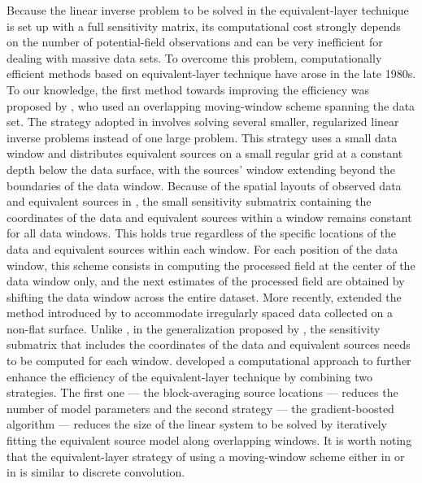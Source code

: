 Because the linear inverse problem to be solved in the equivalent-layer technique is set up 
with a full sensitivity matrix, its computational cost strongly depends on the number of 
potential-field observations and can be very inefficient for dealing with massive data sets. 
To overcome this problem, computationally efficient methods based on equivalent-layer 
technique have arose in the late 1980s. 
To our knowledge, the first method towards improving the efficiency  was proposed by \cite{leao-silva1989}, 
who used an overlapping moving-window scheme spanning the data set. 
The strategy adopted in \cite{leao-silva1989} involves solving several smaller, regularized linear 
inverse problems instead of one large problem. 
This strategy uses a small data window and distributes equivalent sources 
on a small regular grid at a constant depth below the data surface, with the sources' window extending beyond 
the boundaries of the data window.
Because of the spatial layouts of observed data and equivalent sources in \cite{leao-silva1989}, the small 
sensitivity submatrix containing the coordinates of the data and equivalent sources within a window remains 
constant for all data windows. This holds true regardless  of the specific locations of the data and equivalent 
sources within each window.
For each position of the data window, this scheme consists in computing the processed field 
at the center of the data window only, and the next estimates of the processed field are 
obtained by shifting the data window across the entire dataset. 
More recently, \cite{soler-uieda2021} extended the method introduced by \cite{leao-silva1989} to accommodate 
irregularly spaced data collected on a non-flat surface.
Unlike  \cite{leao-silva1989}, in the generalization proposed by \cite{soler-uieda2021}, the sensitivity 
submatrix that includes the coordinates of the data and equivalent sources needs to be computed for each window.
\cite{soler-uieda2021}  developed a computational approach to further enhance the efficiency of the 
equivalent-layer technique by combining two strategies. 
The first one --- the block-averaging source locations --- reduces the number of model parameters and the second 
strategy --- the gradient-boosted algorithm --- reduces the size of the linear system to be solved by 
iteratively fitting the equivalent source model along overlapping windows. 
It is worth noting that the equivalent-layer strategy of using a moving-window scheme either in 
\cite{leao-silva1989} or in \cite{soler-uieda2021} is similar to discrete convolution.

